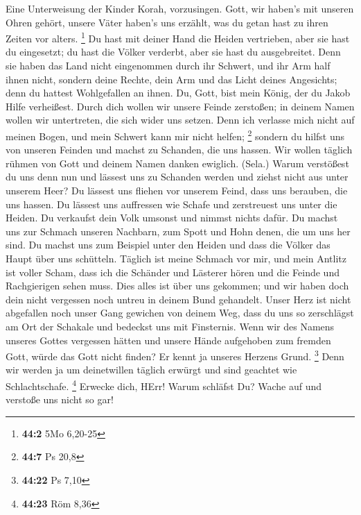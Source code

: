  Eine Unterweisung der Kinder Korah, vorzusingen.
 Gott, wir haben's mit unseren Ohren gehört, unsere Väter
haben's uns erzählt, was du getan hast zu ihren Zeiten vor alters.
\footnote{\textbf{44:2} 5Mo 6,20-25}  Du hast mit deiner
Hand die Heiden vertrieben, aber sie hast du eingesetzt; du hast die
Völker verderbt, aber sie hast du ausgebreitet.  Denn sie
haben das Land nicht eingenommen durch ihr Schwert, und ihr Arm half
ihnen nicht, sondern deine Rechte, dein Arm und das Licht deines
Angesichts; denn du hattest Wohlgefallen an ihnen.  Du,
Gott, bist mein König, der du Jakob Hilfe verheißest.  Durch
dich wollen wir unsere Feinde zerstoßen; in deinem Namen wollen wir
untertreten, die sich wider uns setzen.  Denn ich verlasse
mich nicht auf meinen Bogen, und mein Schwert kann mir nicht helfen;
\footnote{\textbf{44:7} Ps 20,8}  sondern du hilfst uns von
unseren Feinden und machst zu Schanden, die uns hassen.  Wir
wollen täglich rühmen von Gott und deinem Namen danken ewiglich. (Sela.)
 Warum verstößest du uns denn nun und lässest uns zu
Schanden werden und ziehst nicht aus unter unserem Heer? 
Du lässest uns fliehen vor unserem Feind, dass uns berauben, die uns
hassen.  Du lässest uns auffressen wie Schafe und
zerstreuest uns unter die Heiden.  Du verkaufst dein Volk
umsonst und nimmst nichts dafür.  Du machst uns zur Schmach
unseren Nachbarn, zum Spott und Hohn denen, die um uns her sind.
 Du machst uns zum Beispiel unter den Heiden und dass die
Völker das Haupt über uns schütteln.  Täglich ist meine
Schmach vor mir, und mein Antlitz ist voller Scham,  dass
ich die Schänder und Lästerer hören und die Feinde und Rachgierigen
sehen muss.  Dies alles ist über uns gekommen; und wir
haben doch dein nicht vergessen noch untreu in deinem Bund gehandelt.
 Unser Herz ist nicht abgefallen noch unser Gang gewichen
von deinem Weg,  dass du uns so zerschlägst am Ort der
Schakale und bedeckst uns mit Finsternis.  Wenn wir des
Namens unseres Gottes vergessen hätten und unsere Hände aufgehoben zum
fremden Gott,  würde das Gott nicht finden? Er kennt ja
unseres Herzens Grund. \footnote{\textbf{44:22} Ps 7,10} 
Denn wir werden ja um deinetwillen täglich erwürgt und sind geachtet wie
Schlachtschafe. \footnote{\textbf{44:23} Röm 8,36}  Erwecke
dich, HErr! Warum schläfst Du? Wache auf und verstoße uns nicht so gar!
